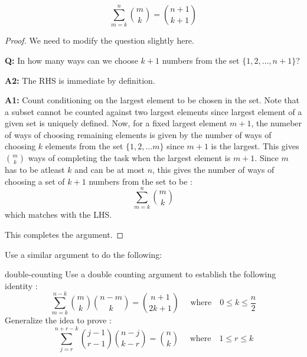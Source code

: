 \begin{proposition}
$$\sum_{m=k}^n {m \choose k} = {n+1 \choose k+1}$$
\end{proposition}
\begin{proof}
We need to modify the question slightly here.
\begin{description}
\item{\bf Q:} In how many ways can we choose $k+1$ numbers from the set $\{1, 2, \ldots, n+1\}$?
\item{\bf A2:} The RHS is immediate by definition.
\item{\bf  A1:} Count conditioning on the largest element to be chosen in the set. Note that a subset cannot be counted against two largest elements since largest element of a given set is uniquely defined. Now, for a fixed largest element $m+1$, the numeber of ways of choosing remaining elements is given by the number of ways of choosing $k$ elements from the set $\{1, 2, \ldots m\}$ since $m+1$ is the largest. This gives ${m \choose k}$ ways of completing the task when the largest element is $m+1$. Since $m$ has to be atleast $k$ and can be at most $n$, this gives the number of ways of choosing a set of $k+1$ numbers from the set to be :
$$\sum_{m=k}^n {m \choose k}$$
which matches with the LHS.
\end{description}
This completes the argument.
\end{proof}
Use a similar argument to do the following:


\begin{exercise-prob}
\begin{show-ps1}{double-counting}
Use a double counting argument to establish the following identity : \\
$$ \sum_{m=k}^{n-k} {m \choose k} {n-m \choose k} = {n+1 \choose 2k+1} \textrm{ ~~~where~~ $0 \le k \le \frac{n}{2}$}
$$
Generalize the idea to prove :
$$ \sum_{j=r}^{n+r-k} {j-1 \choose r-1} {n-j \choose k-r} = {n \choose k} \textrm{ ~~~where~~ $1 \le r \le k$}
$$
\end{show-ps1}
\end{exercise-prob}
